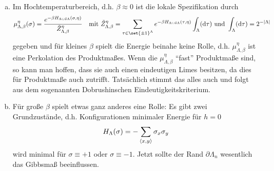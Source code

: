 \begin{enumerate}[a)]
	\item Im Hochtemperaturbereich, d.h. $\beta \approx 0$ ist die lokale Spezifikation durch 
	\begin{align}
		\mu^{\eta}_{\Lambda, \beta} (\sigma) = \frac{e^{-\beta H_{\Lambda \cup \delta\Lambda} \enb{\sigma, \eta} }}{\tilde{Z}^{\eta}_{\Lambda, \beta} } && \text{mit } \tilde{Z}^{\eta}_{\Lambda,\beta} = \sum\limits_{\tau \in \set{\pm 1}^{\Lambda}} e^{-\beta H_{\Lambda \cup \delta \Lambda}(\tau,\eta) } \int_{\Lambda} (\diff \tau)  \text{ und } \int_{\Lambda} (\diff \tau) = 2^{-\abs{\Lambda}}
	\end{align}
	gegeben und für kleines $\beta$ spielt die Energie beinahe keine Rolle, d.h.  $\mu_{\Lambda, \beta}^{\eta}$ ist eine Perkolation des Produktmaßes. 
	Wenn die $\mu_{\Lambda, \beta}^{\eta}$ \enquote{fast} Produktmaße sind, so kann man hoffen, dass sie auch einen eindeutigen Limes besitzen, da dies für Produktmaße auch zutrifft. Tatsächlich stimmt das alles auch und folgt aus dem sogenannten Dobrushinschen Eindeutigkeitskriterium. 
	
	\item Für große $\beta$ spielt etwas ganz anderes eine Rolle: Es gibt zwei Grundzustände, d.h. Konfigurationen minimaler Energie für $h = 0$
	\begin{align}
		H_{\Lambda}(\sigma) = - \sum\limits_{\langle x,y\rangle} \sigma_x \sigma_y
	\end{align}
	wird minimal für $\sigma \equiv + 1$ oder $\sigma \equiv -1$. Jetzt sollte der Rand $\partial \Lambda_n$ wesentlich das Gibbsmaß beeinflussen.
\end{enumerate}



